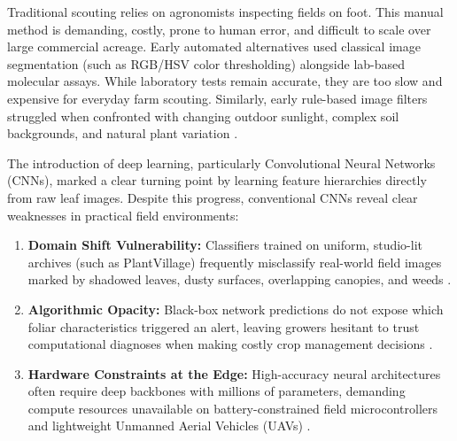 \documentclass[conference]{IEEEtran}
\begin{document}
Traditional scouting relies on agronomists inspecting fields on foot. This manual method is demanding, costly, prone to human error, and difficult to scale over large commercial acreage. Early automated alternatives used classical image segmentation (such as RGB/HSV color thresholding) alongside lab-based molecular assays. While laboratory tests remain accurate, they are too slow and expensive for everyday farm scouting. Similarly, early rule-based image filters struggled when confronted with changing outdoor sunlight, complex soil backgrounds, and natural plant variation \cite{shafik}.

The introduction of deep learning, particularly Convolutional Neural Networks (CNNs), marked a clear turning point by learning feature hierarchies directly from raw leaf images. Despite this progress, conventional CNNs reveal clear weaknesses in practical field environments:
\begin{enumerate}
    \item \textbf{Domain Shift Vulnerability:} Classifiers trained on uniform, studio-lit archives (such as PlantVillage) frequently misclassify real-world field images marked by shadowed leaves, dusty surfaces, overlapping canopies, and weeds \cite{convgem}.
    \item \textbf{Algorithmic Opacity:} Black-box network predictions do not expose which foliar characteristics triggered an alert, leaving growers hesitant to trust computational diagnoses when making costly crop management decisions \cite{balanageshwara}.
    \item \textbf{Hardware Constraints at the Edge:} High-accuracy neural architectures often require deep backbones with millions of parameters, demanding compute resources unavailable on battery-constrained field microcontrollers and lightweight Unmanned Aerial Vehicles (UAVs) \cite{malche}.
\end{enumerate}
\end{document}
